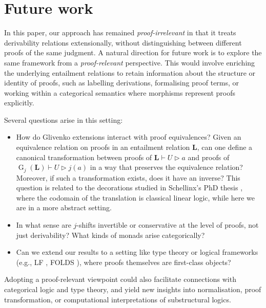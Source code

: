 \documentclass[runningheads]{llncs}
\DeclareMathOperator{\Glivenko}{G}
\begin{document}
\section{Future work}\label{sec-future}

In this paper, %
our approach has remained \emph{proof-irrelevant} in that it treats derivability relations extensionally, without distinguishing between different proofs of the same judgment.
A natural direction for future work is to explore the same framework from a \emph{proof-relevant} perspective. This would involve enriching the underlying entailment relations to retain information about the structure or identity of proofs, such as labelling derivations, formalising proof terms, or working within a categorical semantics where morphisms represent proofs explicitly.

Several questions arise in this setting:
\begin{itemize}
    \item How do Glivenko extensions interact with proof equivalences? Given an equivalence relation on proofs in an entailment relation $\mathbf{L}$, can one define a canonical transformation between proofs of $\mathbf{L} \vdash U \rhd a$ and proofs of $\Glivenko_j(\mathbf{L}) \vdash U \rhd j(a)$ in a way that preserves the equivalence relation? Moreover, if such a transformation exists, does it have an inverse? This question is related to the decorations studied in Schellinx's PhD thesis \cite{schellinx1994noble}, where the codomain of the translation is classical linear logic, while here we are in a more abstract setting.
    \item In what sense are $j$-shifts invertible or conservative at the level of proofs, not just derivability? What kinds of monads arise categorically?
    \item Can we extend our results to a setting like type theory or logical frameworks (e.g., LF \cite{HarperLF87}, FOLDS \cite{makkai1998towards}), where proofs themselves are first-class objects?
\end{itemize}

Adopting a proof-relevant viewpoint could also facilitate connections with categorical logic and type theory, and yield new insights into normalisation, proof transformation, or computational interpretations of substructural logics.
\end{document}
